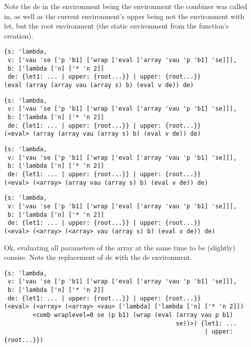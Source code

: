 \documentclass{beamer}
\begin{document}
\begin{frame}[fragile]
Note the de in the environment being the environment the combiner was called in,
as well as the current environment's upper being not the environment with let, but
	the root environment (the static environment from the function's creation).
\footnotesize
\begin{verbatim}
{s: 'lambda,
 v: ['vau 'se ['p 'b1] ['wrap ['eval ['array 'vau 'p 'b1] 'se]]],
 b: ['lambda ['n] ['* 'n 2]]
 de: {let1: ... | upper: {root...}} | upper: {root...}}
(eval (array (array vau (array s) b) (eval v de)) de)
\end{verbatim}
\end{frame}

\begin{frame}[fragile]
\footnotesize
\begin{verbatim}
{s: 'lambda,
 v: ['vau 'se ['p 'b1] ['wrap ['eval ['array 'vau 'p 'b1] 'se]]],
 b: ['lambda ['n] ['* 'n 2]]
 de: {let1: ... | upper: {root...}} | upper: {root...}}
(<eval> (array (array vau (array s) b) (eval v de)) de)
\end{verbatim}
\end{frame}

\begin{frame}[fragile]
\footnotesize
\begin{verbatim}
{s: 'lambda,
 v: ['vau 'se ['p 'b1] ['wrap ['eval ['array 'vau 'p 'b1] 'se]]],
 b: ['lambda ['n] ['* 'n 2]]
 de: {let1: ... | upper: {root...}} | upper: {root...}}
(<eval> (<array> (array vau (array s) b) (eval v de)) de)
\end{verbatim}
\end{frame}

\begin{frame}[fragile]
\footnotesize
\begin{verbatim}
{s: 'lambda,
 v: ['vau 'se ['p 'b1] ['wrap ['eval ['array 'vau 'p 'b1] 'se]]],
 b: ['lambda ['n] ['* 'n 2]]
 de: {let1: ... | upper: {root...}} | upper: {root...}}
(<eval> (<array> (<array> vau (array s) b) (eval v de)) de)
\end{verbatim}
\end{frame}

\begin{frame}[fragile]
Ok, evaluating all parameters of the array at the same time to be (slightly) consise.
Note the replacement of de with the de environment.
\footnotesize
\begin{verbatim}
{s: 'lambda,
 v: ['vau 'se ['p 'b1] ['wrap ['eval ['array 'vau 'p 'b1] 'se]]],
 b: ['lambda ['n] ['* 'n 2]]
 de: {let1: ... | upper: {root...}} | upper: {root...}}
(<eval> (<array> (<array> <vau> ['lambda] ['lambda ['n] ['* 'n 2]])
        <comb wraplevel=0 se (p b1) (wrap (eval (array vau p b1)
		                                        se))>) {let1: ...
												        | upper: {root...}})
\end{verbatim}
\end{frame}
\end{document}
